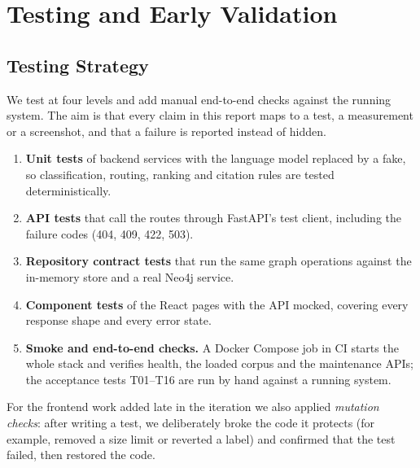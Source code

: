 \chapter{Testing and Early Validation}\label{ch:testing}

\section{Testing Strategy}
We test at four levels and add manual end-to-end checks against the running system. The aim is that every claim in this report maps to a test, a measurement or a screenshot, and that a failure is reported instead of hidden.
\begin{enumerate}
\item \textbf{Unit tests} of backend services with the language model replaced by a fake, so classification, routing, ranking and citation rules are tested deterministically.
\item \textbf{API tests} that call the routes through FastAPI's test client, including the failure codes (404, 409, 422, 503).
\item \textbf{Repository contract tests} that run the same graph operations against the in-memory store and a real Neo4j service.
\item \textbf{Component tests} of the React pages with the API mocked, covering every response shape and every error state.
\item \textbf{Smoke and end-to-end checks.} A Docker Compose job in CI starts the whole stack and verifies health, the loaded corpus and the maintenance APIs; the acceptance tests T01--T16 are run by hand against a running system.
\end{enumerate}
For the frontend work added late in the iteration we also applied \emph{mutation checks}: after writing a test, we deliberately broke the code it protects (for example, removed a size limit or reverted a label) and confirmed that the test failed, then restored the code.

